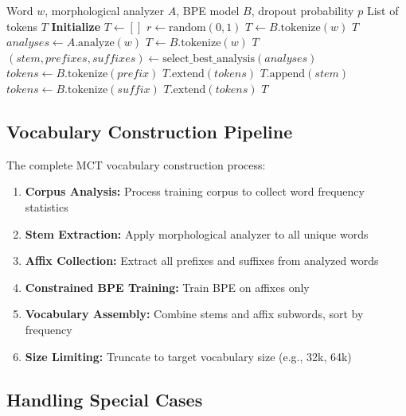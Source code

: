 \documentclass[conference]{IEEEtran}
\begin{document}
\begin{algorithm}[t]
\caption{Morphological-Core Tokenization Algorithm}
\label{alg:mct}
\begin{algorithmic}[1]
\Require Word $w$, morphological analyzer $A$, BPE model $B$, dropout probability $p$
\Ensure List of tokens $T$
\State \textbf{Initialize} $T \leftarrow []$
\State $r \leftarrow \text{random}(0,1)$
 
    \State $T \leftarrow B.\text{tokenize}(w)$
    \State \Return $T$
\EndIf
\State $analyses \leftarrow A.\text{analyze}(w)$
 
    \State $T \leftarrow B.\text{tokenize}(w)$
    \State \Return $T$
\EndIf
\State $(stem, prefixes, suffixes) \leftarrow \text{select\_best\_analysis}(analyses)$
    \State $tokens \leftarrow B.\text{tokenize}(prefix)$
    \State $T.\text{extend}(tokens)$
\EndFor
\State $T.\text{append}(stem)$
    \State $tokens \leftarrow B.\text{tokenize}(suffix)$
    \State $T.\text{extend}(tokens)$
\EndFor
\State \Return $T$
\end{algorithmic}
\end{algorithm}

\subsection{Vocabulary Construction Pipeline}
The complete MCT vocabulary construction process:
\begin{enumerate}
    \item \textbf{Corpus Analysis:} Process training corpus to collect word frequency statistics
    \item \textbf{Stem Extraction:} Apply morphological analyzer to all unique words
    \item \textbf{Affix Collection:} Extract all prefixes and suffixes from analyzed words
    \item \textbf{Constrained BPE Training:} Train BPE on affixes only
    \item \textbf{Vocabulary Assembly:} Combine stems and affix subwords, sort by frequency
    \item \textbf{Size Limiting:} Truncate to target vocabulary size (e.g., 32k, 64k)
\end{enumerate}

\subsection{Handling Special Cases}
\end{document}
